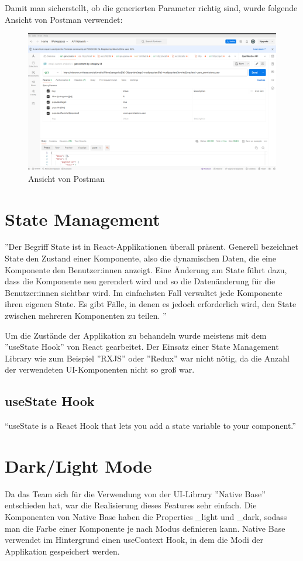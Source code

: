 Damit man sicherstellt, ob die generierten Parameter richtig sind, wurde folgende Ansicht von Postman verwendet:
\begin{figure}[H]
  \centering
  \includegraphics[width=\textwidth]{./pics/postman.png}
  \caption{Ansicht von Postman}

\end{figure}


\section{State Management}
''Der Begriff State ist in React-Applikationen überall präsent. Generell
bezeichnet State den Zustand einer Komponente,
also die dynamischen Daten, die eine Komponente den Benutzer:innen anzeigt.
Eine Änderung am State führt dazu, dass die Komponente neu gerendert wird
und so die Datenänderung für die Benutzer:innen sichtbar wird.
Im einfachsten Fall verwaltet jede Komponente ihren eigenen State.
Es gibt Fälle, in denen es jedoch erforderlich wird,
den State zwischen mehreren Komponenten zu teilen.
''
\cite{state-management}

Um die Zustände der Applikation zu behandeln wurde meistens mit dem ''useState Hook'' von React gearbeitet.
Der Einsatz einer State Management Library wie zum Beispiel ''RXJS'' oder ''Redux'' war nicht nötig, da die Anzahl der verwendeten UI-Komponenten nicht so groß war.

\subsection{useState Hook}
``useState is a React Hook that lets you add a state variable to your component.'' \cite{useState}


\section{Dark/Light Mode}
Da das Team sich für die Verwendung von der UI-Library ''Native Base'' entschieden hat, war die Realisierung dieses Features sehr einfach.
Die Komponenten von Native Base haben die Properties \_light und \_dark, sodass man die Farbe einer Komponente je nach Modus definieren kann.
Native Base verwendet im Hintergrund einen useContext Hook, in dem die Modi der Applikation gespeichert werden.
